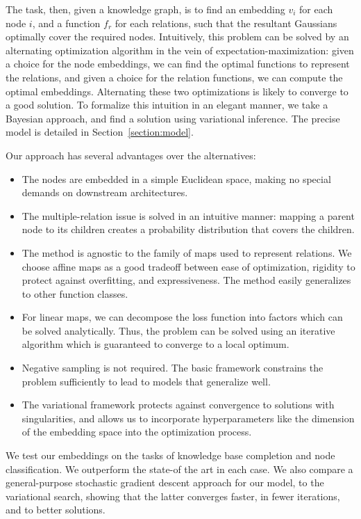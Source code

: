 \documentclass[11pt]{article}
\begin{document}
The task, then, given a knowledge graph, is to find an embedding $v_i$ for each node $i$, and a function $f_r$ for each relations, such that the resultant Gaussians optimally cover the required nodes. Intuitively, this problem can be solved by an alternating optimization algorithm in the vein of expectation-maximization: given a choice for the node embeddings, we can find the optimal functions to represent the relations, and given a choice for the relation functions, we can compute the optimal embeddings. Alternating these two optimizations is likely to converge to a good solution. To formalize this intuition in an elegant manner, we take a Bayesian approach, and find a solution using variational inference. The precise model is detailed in Section~\ref{section:model}.

Our approach has several advantages over the alternatives:
\begin{itemize}
	\item The nodes are embedded in a simple Euclidean space, making no special demands on downstream architectures. %
	\item The multiple-relation issue is solved in an intuitive manner: mapping a parent node to its children creates a probability distribution that covers the children. 
	\item The method is agnostic to the family of maps used to represent relations. We choose affine maps as a good tradeoff between ease of optimization, rigidity to protect against overfitting, and expressiveness. The method easily generalizes to other function classes.
	\item For linear maps, we can decompose the loss function into factors which can be solved analytically. Thus, the problem can be solved using an iterative algorithm which is guaranteed to converge to a local optimum.
	\item Negative sampling is not required. The basic framework constrains the problem sufficiently to lead to models that generalize well.
	\item The variational framework protects against convergence to solutions with singularities, and allows us to incorporate hyperparameters like the dimension of the embedding space into the optimization process.
\end{itemize}

We test our embeddings on the tasks of knowledge base completion and node classification. We outperform the state-of the art in each case. We also compare a general-purpose stochastic gradient descent approach for our model, to the variational search, showing that the latter converges faster, in fewer iterations, and to better solutions.
\end{document}
